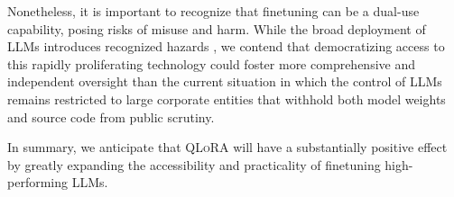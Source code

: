 Nonetheless, it is important to recognize that finetuning can be a dual-use capability, posing risks of misuse and harm. While the broad deployment of LLMs introduces recognized hazards \citep{bommasani2021opportunities,bender2021dangers}, we contend that democratizing access to this rapidly proliferating technology could foster more comprehensive and independent oversight than the current situation in which the control of LLMs remains restricted to large corporate entities that withhold both model weights and source code from public scrutiny.

In summary, we anticipate that \textsc{QLoRA} will have a substantially positive effect by greatly expanding the accessibility and practicality of finetuning high-performing LLMs.